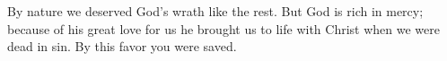
\lettrine{B}{}y nature we deserved God’s wrath like the rest. But God is rich in mercy; because of his great love for us he brought us to life with Christ when we were dead in sin. By this favor you were saved.